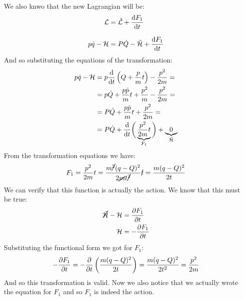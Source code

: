 We also knwo that the new Lagrangian will be:
\begin{equation}
  \begin{split}
    \lagr &= \tilde{\lagr} + \dv{F_1}{t}\\[8pt]
    p\dot{q} - \hamfun &= P\dot{Q} - \tilde{\hamfun} + \dv{F_1}{t}
  \end{split}
\end{equation}
And so substituting the equations of the transformation:
\begin{equation}
  \begin{split}
    p\dot{q} - \hamfun &= p \dv{}{t}\brackets{Q + \dfrac{p}{m}t} - \dfrac{p^2}{2m} =\\
    &= p\dot{Q} + \dfrac{p\dot{p}}{m}t + \dfrac{p^2}{m} - \dfrac{p^2}{2m} =\\
    &= P\dot{Q} + \dfrac{p\dot{p}}{m}t + \dfrac{p^2}{2m}=\\
    &= P\dot{Q} + \dv{}{t}\bbrackets{\underbrace{\dfrac{p^2}{2m}t}_{F_1}} + \underbrace{0}_{\tilde{\hamfun}}
  \end{split}
\end{equation}
From the transformation equations we have:
\begin{equation}
  F_1 = \dfrac{p^2}{2m}t = \dfrac{m\cancel{^2}(q-Q)^2}{2\cancel{m} t\cancel{^2}}\cancel{t} = \dfrac{m(q-Q)^2}{2t}
\end{equation}
We can verify that this function is actually the action. We know that this must be true:
\begin{equation}
  \begin{split}
    \cancel{\tilde{\hamfun}} - \hamfun &= \pdv{F_1}{t}\\
    \hamfun &= -\pdv{F_1}{t}\\
  \end{split}
\end{equation}
Substituting the functional form we got for $F_1$:
\begin{equation}
  -\pdv{F_1}{t} = -\pdv{}{t}\brackets{\dfrac{m(q-Q)^2}{2t}} = \dfrac{m(q-Q)^2}{2t^2} = \dfrac{p^2}{2m}
\end{equation}
And so this transformation is valid. Now we also notice that we actually wrote the \hamjacref\;equation for $F_1$ and so $F_1$ is indeed the action.
